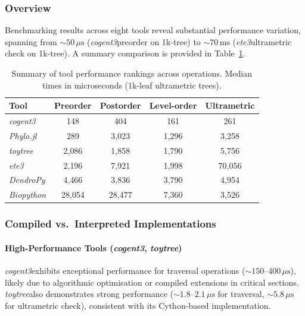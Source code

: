\documentclass[11pt, a4paper]{article}
\newcommand{\dendropy}{\textit{DendroPy}}
\newcommand{\cogent}{\textit{cogent3}}
\newcommand{\biopython}{\textit{Biopython}}
\newcommand{\ete}{\textit{ete3}}
\newcommand{\toytree}{\textit{toytree}}
\newcommand{\phylo}{\textit{Phylo.jl}}
\begin{document}
\subsubsection{Overview}

Benchmarking results across eight tools reveal substantial performance variation,
spanning from $\sim 50\,\mu\text{s}$ (\cogent preorder on 1k-tree) to
$\sim 70\,\text{ms}$ (\ete ultrametric check on 1k-tree).
A summary comparison is provided in Table~\ref{tab:summary}.

\begin{table}[h!]
\centering
\caption{Summary of tool performance rankings across operations.
         Median times in microseconds (1k-leaf ultrametric trees).}
\label{tab:summary}
\begin{tabular}{lcccc}
\toprule
\textbf{Tool} & \textbf{Preorder} & \textbf{Postorder} & \textbf{Level-order} & \textbf{Ultrametric} \\
\midrule
\cogent       & 148     & 404     & 161     & 261     \\
\phylo        & 289     & 3{,}023 & 1{,}296 & 3{,}258 \\
\toytree      & 2{,}086 & 1{,}858 & 1{,}790 & 5{,}756 \\
\ete          & 2{,}196 & 7{,}921 & 1{,}998 & 70{,}056 \\
\dendropy     & 4{,}466 & 3{,}836 & 3{,}790 & 4{,}954 \\
\biopython    & 28{,}054 & 28{,}477 & 7{,}360 & 3{,}526 \\
\bottomrule
\end{tabular}
\end{table}

\subsubsection{Compiled vs.\ Interpreted Implementations}

\paragraph{High-Performance Tools (\cogent, \toytree)}

\cogent exhibits exceptional performance for traversal operations
($\sim 150$--$400\,\mu\text{s}$), likely due to algorithmic optimisation or compiled
extensions in critical sections. \toytree also demonstrates strong performance
($\sim 1.8$--$2.1\,\mu\text{s}$ for traversal, $\sim 5.8\,\mu\text{s}$ for
ultrametric check), consistent with its Cython-based implementation.
\end{document}
